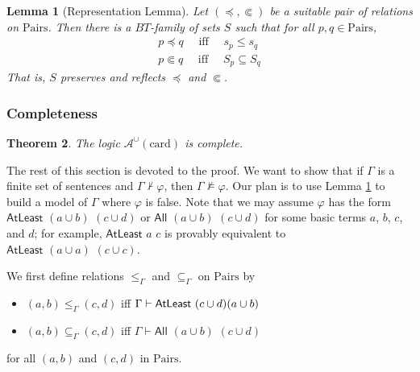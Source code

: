 \documentclass[letterpaper]{article}
\newtheorem{theorem}{Theorem}[section]
\newtheorem{lemma}[theorem]{Lemma}
\theoremstyle{definition}
\newcommand{\proves}{\vdash}
\newcommand{\quadiff}{\quad \mbox{ iff } \quad}
\newcommand{\Aunion}{\mathscr{A}^{\cup}}
\newcommand{\All}[2]{\mathsf{All}\,\,#1\,\,#2}
\newcommand{\Atleast}[2]{\mathsf{AtLeast}\,\,#1\,\,#2}
\newcommand{\card}{\mathrm{card}}
\newcommand{\Pairs}{\mbox{Pairs}}
\newcommand{\precsubseteq}{\Subset}
\newcommand{\provsub}{\subseteq_{\Gamma}}
\newcommand{\provle}{\le_{\Gamma}}
\begin{document}
\begin{lemma} [Representation Lemma]
Let $(\preceq, \precsubseteq)$ be a suitable pair of relations on $\Pairs$.
Then there is a $BT$-family of sets $S$
such that for all $p,q\in\Pairs$,
\begin{align}
\label{goal-main1-first}
p \preceq q \quadiff 
 s_{p}\leq s_q  \\
\label{goal-main2-first} 
 p \precsubseteq  q \quadiff 
S_{p}\subseteq S_{q}
 \end{align}
 That is, $S$ preserves and reflects $\preceq$ and $\precsubseteq$.
 \label{lemma-representation}
 \end{lemma}

\subsubsection{Completeness}
\label{section-completeness}

\begin{theorem}
The logic $\Aunion(\card)$ is complete.
\label{theorem-completeness-Aunioncard}
\end{theorem}

The rest of this section is devoted to the proof.  We want to show that if $\Gamma$ is a finite set of sentences and $\Gamma \not \proves \varphi$, then $\Gamma \not \models \varphi$.  Our plan is to use Lemma \ref{lemma-representation} to build a model of $\Gamma$ where $\varphi$ is false. Note that we may assume $\varphi$ has the form $\Atleast{(a\cup b)}{(c\cup d)}$ or $\All{(a\cup b)}{(c\cup d)}$ for some basic terms $a$, $b$, $c$, and $d$; for example, $\Atleast{a}{c}$ is provably equivalent to $\Atleast{(a\cup a)}{(c\cup c)}$.

We first define relations $\provle$ and $\provsub$ on $\Pairs$ by

\begin{itemize}%
    \item $(a,b) \provle (c,d)$ iff $\Gamma \vdash  \Atleast{(c \cup d){(a \cup b)}}$
    
    \item $(a,b) \provsub (c,d)$ iff $\Gamma \vdash \All{(a \cup b)}{(c \cup d)}$
\end{itemize}
for all $(a,b)$ and  $(c,d)$ in $\Pairs$.  

\end{document}
